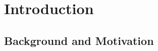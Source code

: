 \documentclass[11pt, oneside]{report}
\begin{document}
{%



\chapter{Introduction}
\label{chapter:introduction}

\section{Background and Motivation}
\label{sec:introduction:background:and:motivation}



}
\end{document}
